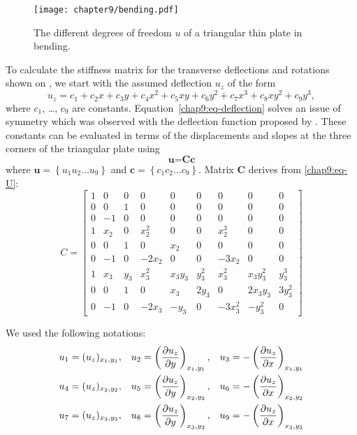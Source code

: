 \begin{figure}[ht]
\centering
\texttt{[image: chapter9/bending.pdf]}
\caption {The different degrees of freedom $u$ of a triangular thin plate in bending.}
\label{chap9:fig-triangle}
\end{figure}
%
To calculate the stiffness matrix for the transverse deflections and rotations shown on , we start with the assumed deflection $u_z$ of the form
\begin{equation}
 u_z = c_1 + c_2x + c_3y + c_4x^2 + c_5xy + c_6y^2 + c_7x^3 + c_8xy^2 + c_9y^3,
\label{chap9:eq-deflection}
\end{equation} 
where $c_1$, \ldots , $c_9$ are constants. Equation~\ref{chap9:eq-deflection} solves an issue of symmetry which was observed with the deflection function proposed by \cite{Przemieniecki85}. These constants can be evaluated in terms of the displacements and slopes at the three corners of the triangular plate using 
\begin{equation}
\textbf{u} = \textbf{Cc}
\label{chap9:eq-U}
\end{equation} 
where $\textbf{u} = \left\{u_1 u_2 \ldots u_9 \right\} $ and $\textbf{c} = \left\{c_1 c_2 \ldots c_9 \right\} $. Matrix $\textbf{C}$ derives from \eqref{chap9:eq-U}:
\begin{equation}
C = 
	\begin{bmatrix}
	1 & 0 & 0 & 0 & 0 & 0 & 0 & 0 & 0 \\
 	0 & 0 & 1 & 0 & 0 & 0 & 0 & 0 & 0 \\
	0 & -1 & 0 & 0 & 0 & 0 & 0 & 0 & 0 \\
	1 & x_2 & 0 & x_2^2 & 0 & 0 & x_2^3 & 0 & 0 \\
	0 & 0 & 1 & 0 & x_2 & 0 & 0 & 0 & 0 \\
	0 & -1 & 0 & -2x_2 & 0 & 0 & -3x_2 & 0 & 0 \\
	1 & x_3 & y_3 & x_3^2 & x_3y_3 & y_3^2 & x_3^2 & x_3y_3^2& y_3^3 \\
	0 & 0 & 1 & 0 & x_3 & 2y_3 & 0 & 2x_3y_3 & 3y_3^2 \\
	0 & -1 & 0 & -2x_3 & -y_3 & 0 & -3x_3^2 & -y_3^2 & 0
	\end{bmatrix}
\end{equation} 

We used the following notations:
\begin{align}
u_1 &= (u_z)_{x_1,y_1}, & u_2 &= \left(\frac{\partial u_z}{\partial y}\right)_{x_1,y_1}, & u_3 &= - \left(\frac{\partial u_z}{\partial x}\right)_{x_1,y_1} \notag \\
u_4 &= (u_z)_{x_2,y_2}, & u_5 &= \left(\frac{\partial u_z}{\partial y}\right)_{x_2,y_2}, & u_6 &= - \left(\frac{\partial u_z}{\partial x}\right)_{x_2,y_2} \label{chap9:ui} \\
u_7 &= (u_z)_{x_3,y_3}, & u_8 &= \left(\frac{\partial u_z}{\partial y}\right)_{x_3,y_3}, & u_9 &= - \left(\frac{\partial u_z}{\partial x}\right)_{x_3,y_3} \notag \\
\end{align} 

